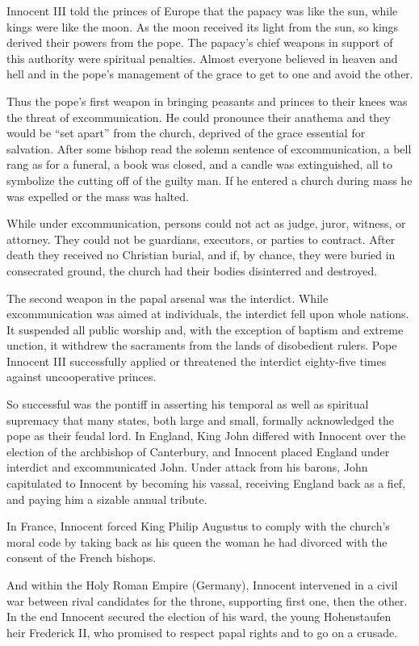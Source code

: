 Innocent III told the princes of Europe that the papacy was like the sun, while kings were like the
moon. As the moon received its light from the sun, so kings derived their powers from the pope. The
papacy’s chief weapons in support of this authority were spiritual penalties. Almost everyone
believed in heaven and hell and in the pope’s management of the grace to get to one and avoid the
other.

Thus the pope’s first weapon in bringing peasants and princes to their knees was the threat of
excommunication. He could pronounce their anathema and they would be “set apart” from the church,
deprived of the grace essential for salvation. After some bishop read the solemn sentence of
excommunication, a bell rang as for a funeral, a book was closed, and a candle was extinguished, all
to symbolize the cutting off of the guilty man. If he entered a church during mass he was expelled
or the mass was halted.

While under excommunication, persons could not act as judge, juror, witness, or attorney. They could
not be guardians, executors, or parties to contract. After death they received no Christian burial,
and if, by chance, they were buried in consecrated ground, the church had their bodies disinterred
and destroyed.

The second weapon in the papal arsenal was the interdict. While excommunication was aimed at
individuals, the interdict fell upon whole nations. It suspended all public worship and, with the
exception of baptism and extreme unction, it withdrew the sacraments from the lands of disobedient
rulers. Pope Innocent III successfully applied or threatened the interdict eighty-five times against
uncooperative princes.

So successful was the pontiff in asserting his temporal as well as spiritual supremacy that many
states, both large and small, formally acknowledged the pope as their feudal lord. In England, King
John differed with Innocent over the election of the archbishop of Canterbury, and Innocent placed
England under interdict and excommunicated John. Under attack from his barons, John capitulated to
Innocent by becoming his vassal, receiving England back as a fief, and paying him a sizable annual
tribute.

In France, Innocent forced King Philip Augustus to comply with the church’s moral code by taking
back as his queen the woman he had divorced with the consent of the French bishops.

And within the Holy Roman Empire (Germany), Innocent intervened in a civil war between rival
candidates for the throne, supporting first one, then the other. In the end Innocent secured the
election of his ward, the young Hohenstaufen heir Frederick II, who promised to respect papal rights
and to go on a crusade.

